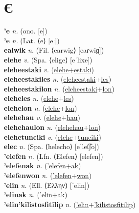 

\section{Є}

\textbf{'e} \textit{n.} (ono. [e])
 \label{'e} \\
\textbf{'e} \textit{n.} (Lat. ⟨e⟩ [eː])
 \label{'e} \\
\textbf{ealwik} \textit{n.} (Fil. ⟨earwig⟩ [eaɾwiɡ])
 \label{ealwik} \\
\textbf{elehe} \textit{v.} (Spa. ⟨elige⟩ [eˈlixe])
 \label{elehe} \\
\textbf{eleheestaki} \textit{v.} (\hyperref[elehe]{elehe}+\hyperref[estaki]{estaki})
 \label{eleheestaki} \\
\textbf{eleheestakiles} \textit{n.} (\hyperref[eleheestaki]{eleheestaki}+\hyperref[les]{les})
 \label{eleheestakiles} \\
\textbf{eleheestakilon} \textit{n.} (\hyperref[eleheestaki]{eleheestaki}+\hyperref[lon]{lon})
 \label{eleheestakilon} \\
\textbf{eleheles} \textit{n.} (\hyperref[elehe]{elehe}+\hyperref[les]{les})
 \label{eleheles} \\
\textbf{elehelon} \textit{n.} (\hyperref[elehe]{elehe}+\hyperref[lon]{lon})
 \label{elehelon} \\
\textbf{elehehau} \textit{v.} (\hyperref[elehe]{elehe}+\hyperref[hau]{hau})
 \label{elehehau} \\
\textbf{elehehaulon} \textit{n.} (\hyperref[elehehau]{elehehau}+\hyperref[lon]{lon})
 \label{elehehaulon} \\
\textbf{elehetunciki} \textit{v.} (\hyperref[elehe]{elehe}+\hyperref[tunciki]{tunciki})
 \label{elehetunciki} \\
\textbf{elec} \textit{n.} (Spa. ⟨helecho⟩ [eˈlet͡ʃo])
 \label{elec} \\
\textbf{'elefen} \textit{n.} (Lfn. ⟨Elefen⟩ [elefen])
 \label{'elefen} \\
\textbf{'elefenak} \textit{n.} (\hyperref['elefen]{'elefen}+\hyperref[ak]{ak})
 \label{'elefenak} \\
\textbf{'elefenwon} \textit{n.} (\hyperref['elefen]{'elefen}+\hyperref[won]{won})
 \label{'elefenwon} \\
\textbf{'elin} \textit{n.} (Ell. ⟨Έλλην⟩ [ˈelin])
 \label{'elin} \\
\textbf{'elinak} \textit{n.} (\hyperref['elin]{'elin}+\hyperref[ak]{ak})
 \label{'elinak} \\
\textbf{'elin'kilistosfitilip} \textit{n.} (\hyperref['elin]{'elin}+\hyperref['kilistosfitilip]{'kilistosfitilip})
